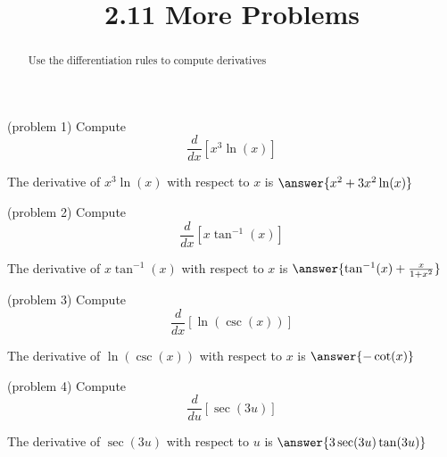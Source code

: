 \documentclass{ximera}
\title{2.11 More Problems}
\begin{document}
\begin{abstract}
Use the differentiation rules to compute derivatives
\end{abstract}

\maketitle








\begin{problem}(problem 1)
  Compute
  \[
  \frac{d}{dx}\left[x^3\ln(x)\right]
  \]
  
    
    
		The derivative of $x^3\ln (x)$ with respect to $x$ is
		 $\answer{x^2 + 3x^2\ln(x)}$
		
\end{problem}





\begin{problem}(problem 2)
  Compute
  \[
  \frac{d}{dx} \left[x \tan^{-1} (x)\right]
  \]
  
    
    
		The derivative of $x \tan^{-1} (x)$ with respect to $x$ is
		 $\answer{\tan^{-1}(x) + \frac{x}{1+x^2}}$
		
\end{problem}



\begin{problem}(problem 3)
  Compute
  \[
  \frac{d}{dx}\left[ \ln(\csc (x))\right]
  \]
  
    
    
		The derivative of $\ln(\csc (x))$ with respect to $x$ is
		 $\answer{-\cot(x)}$
		
\end{problem}

\begin{foldable}
\end{foldable}

\begin{problem}(problem 4)
  Compute
  \[
  \frac{d}{du} \left[\sec(3u)\right]
  \]
  
    
    
		The derivative of $\sec(3u)$ with respect to $u$ is
		 $\answer{3\sec(3u)\tan(3u)}$
		
\end{problem}
\end{document}
